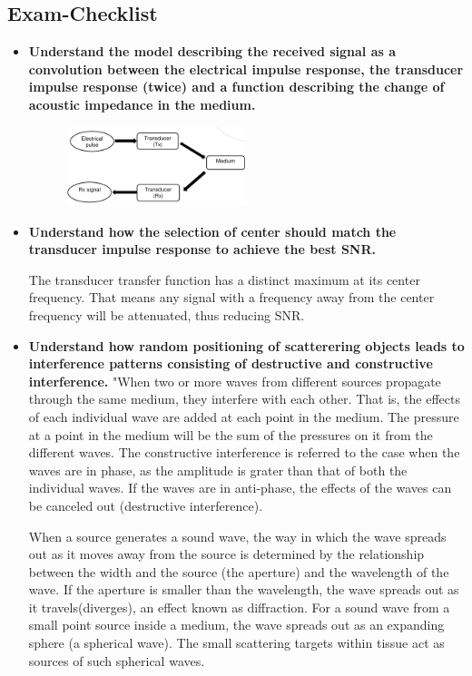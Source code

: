 \documentclass[10pt,a4paper,noendnumber=true]{scrartcl}
\begin{document}
\subsection{Exam-Checklist}
\begin{itemize}
\item \textbf{Understand the model describing the received signal as a convolution between the electrical impulse response, the transducer impulse response (twice) and a function describing the change of acoustic impedance in the medium.}

\begin{figure}[H]
\centering
\includegraphics[width=0.5\textwidth]{img/pulseecho1.png}
\end{figure}

\item \textbf{Understand how the selection of center should match the transducer impulse response to achieve the best SNR.}

The transducer transfer function has a distinct maximum at its center frequency. That means any signal with a frequency away from the center frequency will be attenuated, thus reducing SNR.

\item \textbf{Understand how random positioning of scatterering objects leads to interference patterns consisting of destructive and constructive interference.}
"When two or more waves from different sources propagate through the same medium, they interfere with each other. That is, the effects of each individual wave are added at each point in the medium. The pressure at a point in the medium will be the sum of the pressures on it from the different waves. The constructive interference is referred to the case when the waves are in phase, as the amplitude is grater than that of both the individual waves. If the waves are in anti-phase, the effects of the waves can be canceled out (destructive interference). 

When a source generates a sound wave, the way in which the wave spreads out as it moves away from the source is determined by the relationship between the width and the source (the aperture) and the wavelength of the wave. If the aperture is smaller than the wavelength, the wave spreads out as it travels(diverges), an effect known as diffraction. For a sound wave from a small point source inside a medium, the wave spreads out as an expanding sphere (a spherical wave). The small scattering targets within tissue act as sources of such spherical waves. 


\end{itemize}
\end{document}
